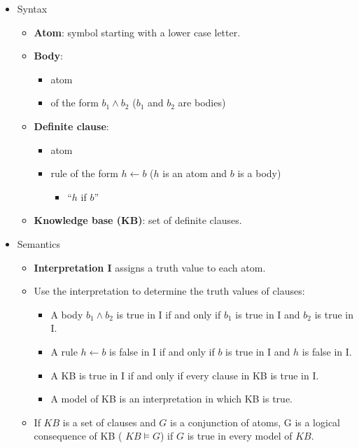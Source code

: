 \documentclass{article}
\begin{document}
\begin{itemize}
    \item Syntax
        \begin{itemize}
            \item \textbf{Atom}: symbol starting with a lower case letter.
            \item \textbf{Body}: 
                \begin{itemize}
                    \item atom
                    \item of the form $b_1 \wedge b_2$ ($b_1$ and $b_2$ are bodies)
                \end{itemize}
            \item \textbf{Definite clause}:
                \begin{itemize}
                    \item atom
                    \item rule of the form $h \leftarrow b$ ($h$ is an atom and $b$ is a body)
                        \begin{itemize}
                            \item ``$h$ if $b$''
                        \end{itemize}
                \end{itemize}
            \item \textbf{Knowledge base (KB)}: set of definite clauses.
        \end{itemize}
    \item Semantics
        \begin{itemize}
            \item \textbf{Interpretation I} assigns a truth value to each atom.
            \item Use the interpretation to determine the truth values of clauses:
                \begin{itemize}
                    \item A body $b_1 \wedge b_2$ is true in I if and only if $b_1$ is true in I and $b_2$ is true in I.
                    \item A rule $h \leftarrow b$ is false in I if and only if $b$ is true in I and $h$ is false in I.
                    \item A KB is true in I if and only if every clause in KB is true in I.
                    \item A model of KB is an interpretation in which KB is true.
                \end{itemize}
            \item If $KB$ is a set of clauses and $G$ is a conjunction of atoms, G is a logical consequence of KB ( $KB \vDash G$) if $G$ is true in every model of $KB$.
        \end{itemize}
\end{itemize}
\end{document}
